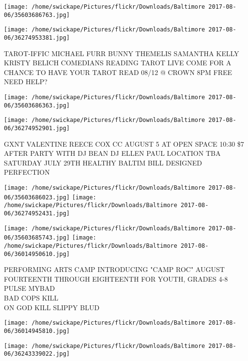 \documentclass[10pt,letterpaper]{article}
\begin{document}
\texttt{[image: /home/swickape/Pictures/flickr/Downloads/Baltimore 2017-08-06/35603686763.jpg]}

\vspace{0.25in}
\texttt{[image: /home/swickape/Pictures/flickr/Downloads/Baltimore 2017-08-06/36274953381.jpg]}

TAROT{-}IFFIC MICHAEL FURR BUNNY THEMELIS SAMANTHA KELLY KRISTY BELICH COMEDIANS READING TAROT LIVE COME FOR A CHANCE TO HAVE YOUR TAROT READ 08/12 @ CROWN 8PM FREE\\
NEED HELP?\\
\pagebreak

\texttt{[image: /home/swickape/Pictures/flickr/Downloads/Baltimore 2017-08-06/35603686363.jpg]}

\vspace{0.25in}
\texttt{[image: /home/swickape/Pictures/flickr/Downloads/Baltimore 2017-08-06/36274952901.jpg]}

GXNT VALENTINE REECE COX CC AUGUST 5 AT OPEN SPACE 10:30 \$7 AFTER PARTY WITH DJ BEAN DJ ELLEN PAUL LOCATION TBA\\
SATURDAY JULY 29TH HEALTHY BALTIM BILL DESIGNED PERFECTION\\
\pagebreak

\texttt{[image: /home/swickape/Pictures/flickr/Downloads/Baltimore 2017-08-06/35603686023.jpg]}
\texttt{[image: /home/swickape/Pictures/flickr/Downloads/Baltimore 2017-08-06/36274952431.jpg]}

\texttt{[image: /home/swickape/Pictures/flickr/Downloads/Baltimore 2017-08-06/35603685743.jpg]}
\texttt{[image: /home/swickape/Pictures/flickr/Downloads/Baltimore 2017-08-06/36014950610.jpg]}

PERFORMING ARTS CAMP INTRODUCING "CAMP ROC" AUGUST FOURTEENTH THROUGH EIGHTEENTH FOR YOUTH, GRADES 4{-}8\\
PULSE MYBAD\\
BAD COPS KILL\\
ON GOD KILL SLIPPY BLUD\\
\pagebreak

\texttt{[image: /home/swickape/Pictures/flickr/Downloads/Baltimore 2017-08-06/36014945810.jpg]}

\vspace{0.25in}
\texttt{[image: /home/swickape/Pictures/flickr/Downloads/Baltimore 2017-08-06/36243339022.jpg]}
\end{document}
